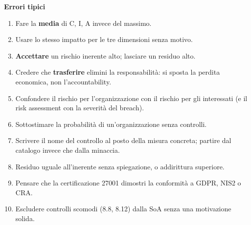 \begin{esame}
\textbf{Errori tipici}
\begin{enumerate}
  \item Fare la \textbf{media} di C, I, A invece del massimo.
  \item Usare lo stesso impatto per le tre dimensioni senza motivo.
  \item \textbf{Accettare} un rischio inerente alto; lasciare un residuo alto.
  \item Credere che \textbf{trasferire} elimini la responsabilità: si sposta la perdita economica, non
    l'accountability.
  \item Confondere il rischio per l'organizzazione con il rischio per gli interessati (e il risk assessment
    con la severità del breach).
  \item Sottostimare la probabilità di un'organizzazione senza controlli.
  \item Scrivere il nome del controllo al posto della misura concreta; partire dal catalogo invece che dalla
    minaccia.
  \item Residuo uguale all'inerente senza spiegazione, o addirittura superiore.
  \item Pensare che la certificazione 27001 dimostri la conformità a GDPR, NIS2 o CRA.
  \item Escludere controlli scomodi (8.8, 8.12) dalla SoA senza una motivazione solida.
\end{enumerate}
\end{esame}

